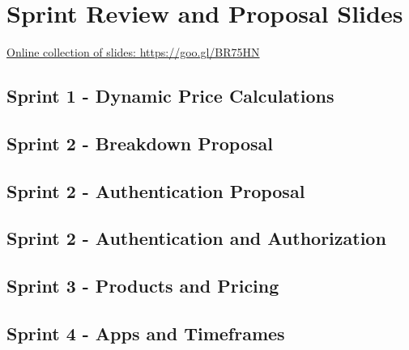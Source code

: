 
\chapter{Sprint Review and Proposal Slides}
\label{appendix:slides}

\href{https://goo.gl/BR75HN}{Online collection of slides: https://goo.gl/BR75HN}

\section{Sprint 1 - Dynamic Price Calculations}
\label{appendix:slides_1}


\section{Sprint 2 - Breakdown Proposal}
\label{appendix:slides_2_breakdown}


\section{Sprint 2 - Authentication Proposal}
\label{appendix:slides_2_authentication}


\section{Sprint 2 - Authentication and Authorization}
\label{appendix:slides_2}


\section{Sprint 3 - Products and Pricing}
\label{appendix:slides_3}


\section{Sprint 4 - Apps and Timeframes}
\label{appendix:slides_4}


